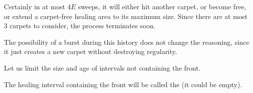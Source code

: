 \documentclass[12pt]{memoir}
\newcommand{\authnote}[3]
{\text{{ \textcolor{#3}{\( \langle\hspace{-0.2em}\langle \)\textsf{\footnotesize #1: #2}\( \rangle\hspace{-0.2em}\rangle \)}}}}
\newcommand{\authnote}[2]{}
\newcommand{\Pnote}[1]{{\authnote{P}{#1}{cyan}}}
\def\B{B}
\newcommand{\E}{E}
\newcommand{\cns}[1]{c_{\textrm{\upshape #1}}}
\begin{document}
\begin{Proof}
Certainly in at most \( 4\E \) sweeps, it will either hit another carpet, or become free,
or extend a carpet-free healing area to its maximum size.
Since there are at most 3 carpets to consider, the process terminates soon.

The possibility of a burst during this history does not change the reasoning, since it just
creates a new carpet without destroying regularity.
\end{Proof}



Let us limit the size and age of intervals not containing the front.

\begin{definition}\label{def:mainland}
The healing interval containing the front will be called the  (it could be empty).
\end{definition}
\end{document}
